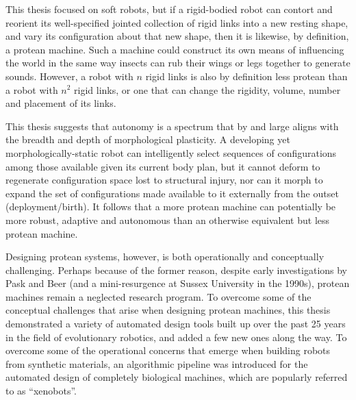 This thesis focused on soft robots,
but if a rigid-bodied robot can contort and reorient its well-specified jointed collection of rigid links into a new resting shape, and vary its configuration about that new shape, then it is likewise, by definition, a protean machine.
Such a machine could construct its own means of influencing the world in the same way insects can rub their wings or legs together
to generate sounds.
However, a robot with $n$ rigid links is also by definition less protean than a robot with $n^2$ rigid links, or one that can change the rigidity, volume, number and placement of its links.

This thesis suggests that autonomy is a spectrum that by and large aligns with the breadth and depth of morphological plasticity.
A developing yet morphologically-static robot \cite{husbands1998better,floreano1996plastic,bongard2011morphological,bongard2006resilient,cully2015robots} can intelligently select sequences of configurations among those available given its current body plan,
but it cannot deform to regenerate configuration space lost to structural injury, nor can it morph to expand the set of configurations made available to it externally from the outset (deployment/birth).
It follows that a more protean machine can potentially be more robust, adaptive and autonomous than an otherwise equivalent but less protean machine.


Designing protean systems, however, is both operationally and conceptually challenging.
Perhaps because of the former reason, despite early investigations by Pask and Beer (and a mini-resurgence 
at Sussex University in the 1990s), protean machines remain a neglected research program.
To overcome some of the conceptual challenges that arise when designing protean machines,
this thesis demonstrated
a variety of automated design tools built up over the past 25 years in the field of evolutionary robotics, and added a few new ones along the way.
To overcome some of the operational concerns that emerge when building robots from synthetic materials,
an algorithmic pipeline was introduced for the 
automated design of completely biological machines,
which are popularly referred to as ``xenobots''.


